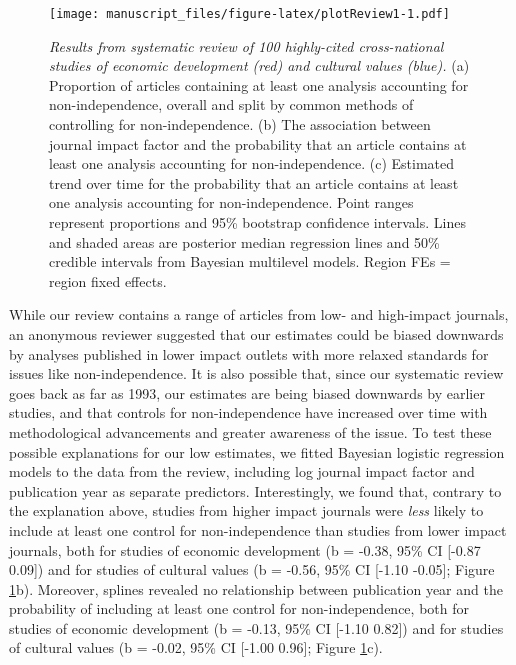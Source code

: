 \documentclass[
  man,floatsintext]{apa6}
\begin{document}
\begin{figure}
\centering
\texttt{[image: manuscript\_files/figure-latex/plotReview1-1.pdf]}
\caption{\label{fig:plotReview1}\emph{Results from systematic review of 100 highly-cited cross-national studies of economic development (red) and cultural values (blue).} (a) Proportion of articles containing at least one analysis accounting for non-independence, overall and split by common methods of controlling for non-independence. (b) The association between journal impact factor and the probability that an article contains at least one analysis accounting for non-independence. (c) Estimated trend over time for the probability that an article contains at least one analysis accounting for non-independence. Point ranges represent proportions and 95\% bootstrap confidence intervals. Lines and shaded areas are posterior median regression lines and 50\% credible intervals from Bayesian multilevel models. Region FEs = region fixed effects.}
\end{figure}

While our review contains a range of articles from low- and high-impact journals, an anonymous reviewer suggested that our estimates could be biased downwards by analyses published in lower impact outlets with more relaxed standards for issues like non-independence. It is also possible that, since our systematic review goes back as far as 1993, our estimates are being biased downwards by earlier studies, and that controls for non-independence have increased over time with methodological advancements and greater awareness of the issue. To test these possible explanations for our low estimates, we fitted Bayesian logistic regression models to the data from the review, including log journal impact factor and publication year as separate predictors. Interestingly, we found that, contrary to the explanation above, studies from higher impact journals were \emph{less} likely to include at least one control for non-independence than studies from lower impact journals, both for studies of economic development (b = -0.38, 95\% CI {[}-0.87 0.09{]}) and for studies of cultural values (b = -0.56, 95\% CI {[}-1.10 -0.05{]}; Figure \ref{fig:plotReview1}b). Moreover, splines revealed no relationship between publication year and the probability of including at least one control for non-independence, both for studies of economic development (b = -0.13, 95\% CI {[}-1.10 0.82{]}) and for studies of cultural values (b = -0.02, 95\% CI {[}-1.00 0.96{]}; Figure \ref{fig:plotReview1}c).
\end{document}
